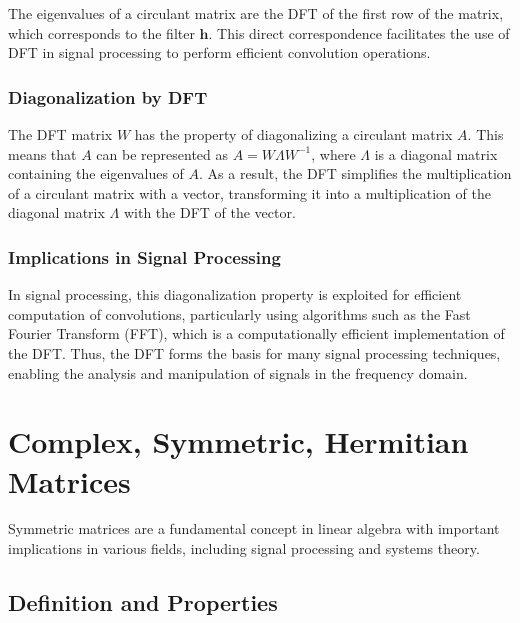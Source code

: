 The eigenvalues of a circulant matrix are the DFT of the first row of the matrix, which corresponds to the filter \( \mathbf{h} \). This direct correspondence facilitates the use of DFT in signal processing to perform efficient convolution operations.

\subsubsection*{Diagonalization by DFT}

The DFT matrix \( W \) has the property of diagonalizing a circulant matrix \( A \). This means that \( A \) can be represented as \( A = W \Lambda W^{-1} \), where \( \Lambda \) is a diagonal matrix containing the eigenvalues of \( A \). As a result, the DFT simplifies the multiplication of a circulant matrix with a vector, transforming it into a multiplication of the diagonal matrix \( \Lambda \) with the DFT of the vector.

\subsubsection*{Implications in Signal Processing}

In signal processing, this diagonalization property is exploited for efficient computation of convolutions, particularly using algorithms such as the Fast Fourier Transform (FFT), which is a computationally efficient implementation of the DFT. Thus, the DFT forms the basis for many signal processing techniques, enabling the analysis and manipulation of signals in the frequency domain.

\section{Complex, Symmetric, Hermitian Matrices}

Symmetric matrices are a fundamental concept in linear algebra with important implications in various fields, including signal processing and systems theory. 

\subsection*{Definition and Properties}

